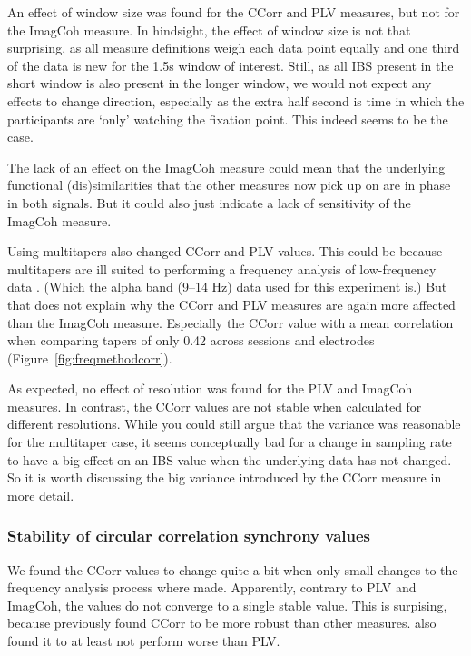 An effect of window size was found for the CCorr and PLV measures, but not for
the ImagCoh measure. In hindsight, the effect of window size is not that
surprising, as all measure definitions weigh each data point equally and one
third of the data is new for the 1.5s window of interest. Still, as all IBS
present in the short window is also present in the longer window, we would not
expect any effects to change direction, especially as the extra half second is
time in which the participants are `only' watching the fixation point. This
indeed seems to be the case.

The lack of an effect on the ImagCoh measure could mean that the underlying
functional (dis)similarities that the other measures now pick up on are in phase
in both signals. But it could also just indicate a lack of sensitivity of the
ImagCoh measure.

Using multitapers also changed CCorr and PLV values. This could
be because multitapers are ill suited to performing a frequency analysis of
low-frequency data \parencite[p.~203]{cohen_analyzing_2014}. (Which the alpha
band (9--14 Hz) data used for this experiment is.) But that does not explain why
the CCorr and PLV measures are again more affected than the ImagCoh measure.
Especially the CCorr value with a mean correlation when comparing tapers of only
0.42 across sessions and electrodes (Figure~\ref{fig:freqmethodcorr}).

As expected, no effect of resolution was found for the PLV and ImagCoh measures.
In contrast, the CCorr values are not stable when calculated for different
resolutions. While you could still argue that the variance was reasonable for
the multitaper case, it seems conceptually bad for a change in sampling rate to
have a big effect on an IBS value when the underlying data has not
changed. So it is worth discussing the big variance introduced by the CCorr
measure in more detail.

\subsubsection{Stability of circular correlation synchrony values}

We found the CCorr values to change quite a bit when only small
changes to the frequency analysis process where made. Apparently, contrary to
PLV and ImagCoh, the values do not converge to a single stable value. This is
surpising, because \textcite{burgess_interpretation_2013} previously found CCorr
to be more robust than other measures. \textcite{pauen_circular_2013} also found
it to at least not perform worse than PLV.

